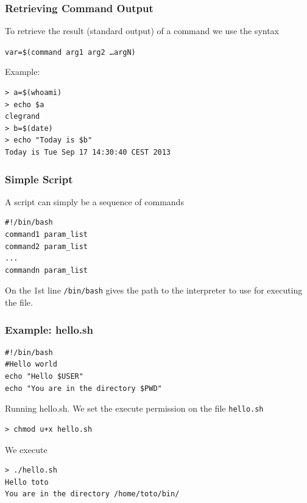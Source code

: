 \documentclass{beamer}
\newenvironment{terminal}{\color{white}\begin{snugshade*}}
{\end{snugshade*}\color{black}}
\begin{document}
\begin{frame}[fragile]
\frametitle{Retrieving Command Output}

To retrieve the result (standard output) of a command we use the syntax
\begin{center}
\texttt{var=\$(command arg1 arg2 \ldots argN)}
\end{center}

{\color{blue} Example:}
\begin{terminal}
\begin{verbatim}
> a=$(whoami)
> echo $a
clegrand
> b=$(date)
> echo "Today is $b"
Today is Tue Sep 17 14:30:40 CEST 2013
\end{verbatim}
\end{terminal}
\end{frame}



\begin{frame}[fragile]

\frametitle{Simple Script}
A script can simply be a sequence of commands

\begin{block}{}

\begin{verbatim}
#!/bin/bash
command1 param_list
command2 param_list
...
commandn param_list
\end{verbatim}

\end{block}
On the 1st line \verb|/bin/bash| gives the path to the interpreter to use for executing the file.
\end{frame}



\begin{frame}[fragile]
\frametitle{Example: hello.sh}
\begin{block}{}
\begin{verbatim}
#!/bin/bash
#Hello world
echo "Hello $USER"
echo "You are in the directory $PWD"
\end{verbatim}
\end{block}

Running hello.sh. We set the execute permission on the file \verb|hello.sh|
\begin{terminal}
\begin{verbatim}
> chmod u+x hello.sh
\end{verbatim}
\end{terminal}
We execute
\begin{terminal}
\begin{verbatim}
> ./hello.sh
Hello toto
You are in the directory /home/toto/bin/
\end{verbatim}
\end{terminal}
\end{frame}
\end{document}

